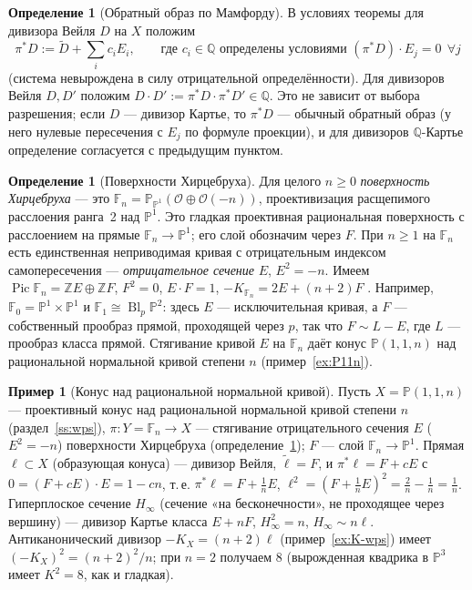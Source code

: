 \documentclass[11pt,a4paper]{article}
\theoremstyle{plain}
\theoremstyle{definition}
\newtheorem{definition}[theorem]{Определение}
\newtheorem{example}[theorem]{Пример}
\theoremstyle{remark}
\newcommand{\Z}{\mathbb{Z}}
\newcommand{\Q}{\mathbb{Q}}
\newcommand{\PP}{\mathbb{P}}
\newcommand{\cO}{\mathcal{O}}
\DeclareMathOperator{\Pic}{Pic}
\DeclareMathOperator{\Bl}{Bl}
\begin{document}
\begin{definition}[Обратный образ по Мамфорду]\label{def:mumford-pullback}
В условиях теоремы для дивизора Вейля $D$ на $X$ положим
\[
\pi^*D:=\tilde D+\sum_ic_iE_i,\qquad\text{где } c_i\in\Q \text{ определены условиями }
(\pi^*D)\cdot E_j=0\ \ \forall j
\]
(система невырождена в силу отрицательной определённости). Для дивизоров Вейля $D,D'$ положим
$D\cdot D':=\pi^*D\cdot\pi^*D'\in\Q$. Это не зависит от выбора разрешения; если $D$ --- дивизор
Картье, то $\pi^*D$ --- обычный обратный образ (у него нулевые пересечения с $E_j$ по формуле
проекции), и для дивизоров $\Q$-Картье определение согласуется с предыдущим пунктом.
\end{definition}

\begin{definition}[Поверхности Хирцебруха]\label{def:Hirzebruch}
Для целого $n\ge0$ \emph{поверхность Хирцебруха} --- это $\mathbb F_n=\PP_{\PP^1}(\cO\oplus\cO(-n))$,
проективизация расщепимого расслоения ранга~2 над $\PP^1$. Это гладкая проективная рациональная
поверхность с расслоением на прямые $\mathbb F_n\to\PP^1$; его слой обозначим через $F$. При $n\ge1$
на $\mathbb F_n$ есть единственная неприводимая кривая с отрицательным индексом самопересечения ---
\emph{отрицательное сечение} $E$, $E^2=-n$. Имеем $\Pic\mathbb F_n=\Z E\oplus\Z F$, $F^2=0$, $E\cdot F=1$,
$-K_{\mathbb F_n}=2E+(n+2)F$ \cite[V.2]{Ha}. Например, $\mathbb F_0=\PP^1\times\PP^1$ и
$\mathbb F_1\cong\Bl_p\PP^2$: здесь $E$ --- исключительная кривая, а $F$ --- собственный прообраз прямой,
проходящей через $p$, так что $F\sim L-E$, где $L$ --- прообраз класса прямой. Стягивание кривой $E$
на $\mathbb F_n$ даёт конус $\PP(1,1,n)$ над рациональной нормальной кривой степени $n$
(пример~\ref{ex:P11n}).
\end{definition}

\begin{example}[Конус над рациональной нормальной кривой]\label{ex:P11n-intersections}
Пусть $X=\PP(1,1,n)$ --- проективный конус над рациональной нормальной кривой степени $n$
(раздел~\ref{ss:wps}), $\pi\colon Y=\mathbb F_n\to X$ --- стягивание отрицательного сечения
$E$ ($E^2=-n$) поверхности Хирцебруха (определение~\ref{def:Hirzebruch}); $F$ --- слой $\mathbb F_n\to\PP^1$. Прямая $\ell\subset X$
(образующая конуса) --- дивизор Вейля, $\tilde\ell=F$, и $\pi^*\ell=F+cE$ с
$0=(F+cE)\cdot E=1-cn$, т.\,е. $\pi^*\ell=F+\frac1nE$, $\ell^2=(F+\frac1nE)^2=\frac2n-\frac1n=\frac1n$.
Гиперплоское сечение $H_\infty$ (сечение «на бесконечности», не проходящее через вершину) ---
дивизор Картье класса $E+nF$, $H_\infty^2=n$, $H_\infty\sim n\ell$. Антиканонический дивизор
$-K_X=(n+2)\ell$ (пример~\ref{ex:K-wps}) имеет $(-K_X)^2=(n+2)^2/n$; при $n=2$ получаем $8$
(вырожденная квадрика в $\PP^3$ имеет $K^2=8$, как и гладкая).
\end{example}
\end{document}
